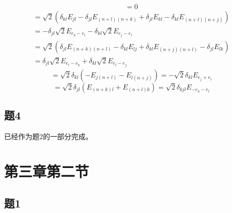 \documentclass{ctexart}
\begin{document}
	\begin{equation}
	[E_{-e_j-e_k},E_{-2e_l}]=0
	\end{equation}
	\begin{multline}
	[E_{e_j+e_k},E_{-2e_l}]=\sqrt{2}(\delta_{kl}E_{jl}-\delta_{jl}E_{(n+l)(n+k)}+\delta_{jl}E_{kl}-\delta_{kl}E_{(n+l)(n+j)})\\=-\delta_{jl}\sqrt 2 E_{e_k-e_l}-\delta_{kl}\sqrt 2E_{e_j-e_l}
	\end{multline}
	\begin{multline}
	[E_{-e_j-e_k},E_{2e_l}]=\sqrt{2}(\delta_{jl}E_{(n+k)(n+l)}-\delta_{kl}E_{lj}+\delta_{kl}E_{(n+j)(n+l)}-\delta_{jl}E_{lk})\\=\delta_{jl}\sqrt 2 E_{e_l-e_k}+\delta_{kl}\sqrt 2E_{e_l-e_j}
	\end{multline}
	\begin{equation}
	[E_{e_j-e_k},E_{2e_l}]=\sqrt{2}\delta_{kl}(-E_{j(n+l)}-E_{l(n+j)})=-\sqrt 2\delta_{kl}E_{e_j+e_l}
	\end{equation}
	\begin{equation}
	[E_{e_j-e_k},E_{-2e_l}]=\sqrt{2}\delta_{jl}(E_{(n+k)l}+E_{(n+l)k})=\sqrt 2\delta_{kjl}E_{-e_k-e_l}
	\end{equation}
	
	\subsection{题4}
	
	已经作为题2的一部分完成。
		
	\section{第三章第二节}
	
	\subsection{题1}
	
\end{document}
